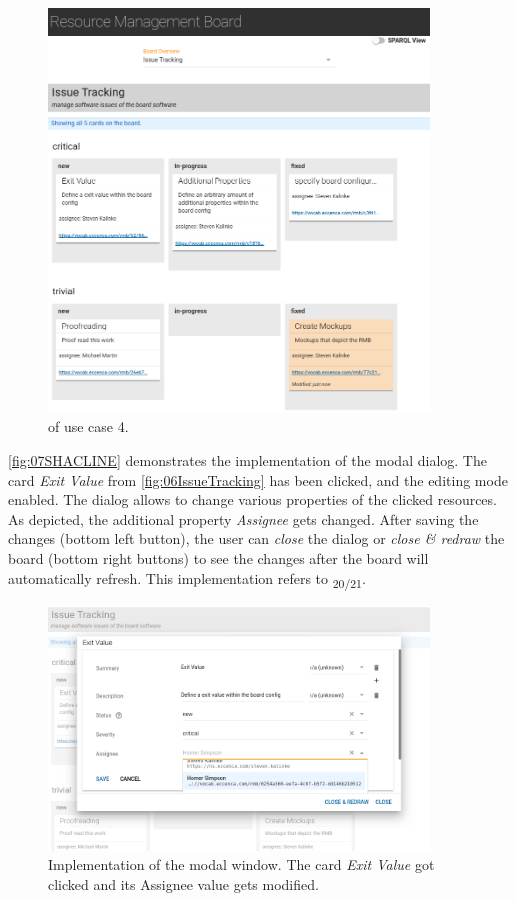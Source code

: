 \begin{figure}[H]
\centering
\includegraphics[width=0.90\textwidth]{img/06-IssueTracking.png}
	\caption[ of Use Case 4]{ of use case 4.}
	\label{fig:06IssueTracking}
\end{figure}

\newpage

\noindent \autoref{fig:07SHACLINE} demonstrates the implementation of the  modal dialog. The card \textit{Exit Value} from \autoref{fig:06IssueTracking} has been clicked, and the editing mode enabled. The dialog allows to change various properties of the clicked resources. As depicted, the additional property \textit{Assignee} gets changed. After saving the changes (bottom left button), the user can \textit{close} the dialog or \textit{close \& redraw} the board (bottom right buttons) to see the changes after the board will automatically refresh. This implementation refers to \textsubscript{20/21}.

\begin{figure}[H]
\centering
\includegraphics[width=0.90\textwidth]{img/07-SHACLINE.png}
	\caption[ Modal Window]{Implementation of the  modal window. The card \textit{Exit Value} got clicked and its Assignee value gets modified.}
	\label{fig:07SHACLINE}
\end{figure}